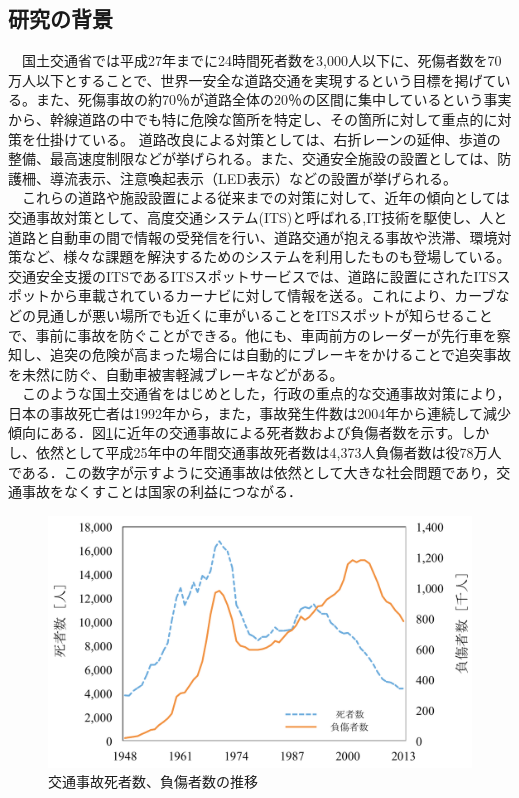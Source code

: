 \documentclass[14pt,a4j]{jsarticle}
\begin{document}
\subsection{研究の背景}
　国土交通省では平成27年までに24時間死者数を3,000人以下に、死傷者数を70万人以下とすることで、世界一安全な道路交通を実現するという目標を掲げている。また、死傷事故の約70％が道路全体の20％の区間に集中しているという事実から、幹線道路の中でも特に危険な箇所を特定し、その箇所に対して重点的に対策を仕掛けている。
道路改良による対策としては、右折レーンの延伸、歩道の整備、最高速度制限などが挙げられる。また、交通安全施設の設置としては、防護柵、導流表示、注意喚起表示（LED表示）などの設置が挙げられる。\\
　これらの道路や施設設置による従来までの対策に対して、近年の傾向としては交通事故対策として、高度交通システム(ITS)\cite{ITS-Japan}と呼ばれる,IT技術を駆使し、人と道路と自動車の間で情報の受発信を行い、道路交通が抱える事故や渋滞、環境対策など、様々な課題を解決するためのシステムを利用したものも登場している。交通安全支援のITSであるITSスポットサービス\cite{MLIT-1}では、道路に設置にされたITSスポットから車載されているカーナビに対して情報を送る。これにより、カーブなどの見通しが悪い場所でも近くに車がいることをITSスポットが知らせることで、事前に事故を防ぐことができる。他にも、車両前方のレーダーが先行車を察知し、追突の危険が高まった場合には自動的にブレーキをかけることで追突事故を未然に防ぐ、自動車被害軽減ブレーキ\cite{MLIT-2}などがある。\\
　このような国土交通省をはじめとした，行政の重点的な交通事故対策により，日本の事故死亡者は1992年から，また，事故発生件数は2004年から連続して減少傾向にある．図\ref{fig:accident-translation}に近年の交通事故による死者数および負傷者数を示す。しかし、依然として平成25年中の年間交通事故死者数は4,373人負傷者数は役78万人\cite{police2013}である．この数字が示すように交通事故は依然として大きな社会問題であり，交通事故をなくすことは国家の利益につながる．\\
\begin{figure}[ht]
  \centering
  \includegraphics[width=1.0\hsize,bb=0 0 624 407]{./img/accident-translation.pdf} %
  \caption{交通事故死者数、負傷者数の推移}
  \label{fig:accident-translation}
\end{figure}
\end{document}
